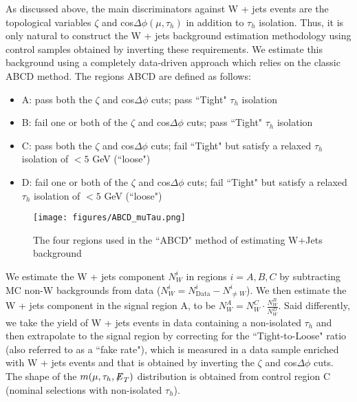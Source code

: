 As discussed above, the main discriminators against W + jets events are the topological variables $\zeta$ and cos$\Delta\phi(\mu,\tau_{h})$ in addition to 
$\tau_{h}$ isolation. Thus, it is only natural to construct the W + jets background estimation methodology using control samples obtained by inverting these 
requirements. We estimate this background using a completely data-driven approach which relies on the classic ABCD method. The regions ABCD are defined as 
follows:

\begin{itemize}
  \item A: pass both the $\zeta$ and cos$\Delta\phi$ cuts; pass ``Tight" $\tau_{h}$ isolation
  \item B: fail one or both of the $\zeta$ and cos$\Delta\phi$ cuts; pass ``Tight" $\tau_{h}$ isolation
  \item C: pass both the $\zeta$ and cos$\Delta\phi$ cuts; fail ``Tight" but satisfy a relaxed $\tau_{h}$ isolation of $< 5$ GeV (``loose")
  \item D: fail one or both of the $\zeta$ and cos$\Delta\phi$ cuts; fail ``Tight" but satisfy a relaxed $\tau_{h}$ isolation of $< 5$ GeV (``loose")
\end{itemize}

\begin{figure}
\centering
\label{fig:ABCD_muTau}
\texttt{[image: figures/ABCD\_muTau.png]}
\caption{The four regions used in the ``ABCD" method of estimating W+Jets background}
\end{figure}

We estimate the W + jets component $N_{W}^{i}$ in regions $i=A,B,C$ by subtracting MC non-W backgrounds
from data ($N_{W}^{i}=N_{\textrm{Data}}^{i}-N_{\neq W}^{i}$). We then estimate the W + jets component in the signal region A, to
be $N_{W}^{A} = N_{W}^{C} \cdot \frac{N_{W}^{B}}{N_{W}^{D}}$. Said differently, we take the yield of W + jets events in data containing a non-isolated $\tau_{h}$ 
and then extrapolate to the signal region by correcting for the ``Tight-to-Loose" ratio (also referred to as a ``fake rate"), which is measured in a data sample 
enriched with W + jets events and that is obtained by inverting the $\zeta$ and cos$\Delta\phi$ cuts. The shape of the $m(\mu,\tau_{h},{\not\mathrel{E}}_T)$ distribution is 
obtained from control region C (nominal selections with non-isolated $\tau_{h}$).

